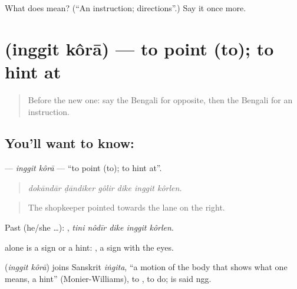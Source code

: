 \begin{tcolorbox}[breakable,colback=teal!4,colframe=teal!35!black,title={Before you move on}]
What does  mean? (\textquotedblleft{}An instruction; directions\textquotedblright{}.) Say it once more.
\end{tcolorbox}
\section[\texorpdfstring{\bn{ইঙ্গিত} \bn{করা} (inggit kôrā)}{ইঙ্গিত করা (inggit kôrā)}]{  (inggit kôrā) — to point (to); to hint at}

\label{lesson:BN-C400-inggit-kora}



\begin{quote}
Before the new one: say the Bengali for opposite, then the Bengali for an instruction.
\end{quote}

\subsection*{You'll want to know:  }
\textbf{ } — \emph{inggit kôrā} — \textquotedblleft{}to point (to); to hint at\textquotedblright{}.

\begin{quote}
     
\end{quote}

\begin{quote}
\emph{dokāndār ḍāndiker gôlir dike inggit kôrlen.}
\end{quote}

\begin{quote}
The shopkeeper pointed towards the lane on the right.
\end{quote}

Past (he/she …):     , \emph{tini nôdīr dike inggit kôrlen}.

 alone is a sign or a hint:  , a sign with the eyes.

\begin{cousinweb}
\textbf{ } (\emph{inggit kôrā}) joins Sanskrit \emph{iṅgita}, \textquotedblleft{}a motion of the body that shows what one means, a hint\textquotedblright{} (Monier-Williams), to , to do;  is said ngg.
\end{cousinweb}

